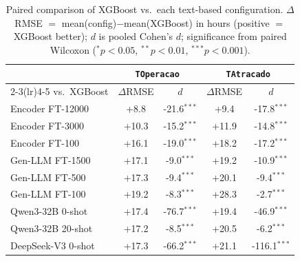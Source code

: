 \documentclass[kdmile,a4paper]{kdmile}
\begin{document}
\begin{table}[t]
\centering
\caption{Paired comparison of XGBoost vs.\ each text-based configuration. $\Delta$RMSE $=$ mean(config)$-$mean(XGBoost) in hours (positive $=$ XGBoost better); $d$ is pooled Cohen's $d$; significance from paired Wilcoxon ($^{*}p{<}0.05$, $^{**}p{<}0.01$, $^{***}p{<}0.001$).}
\label{tab:wilcoxon}
\small
\begin{tabular}{@{}lcccc@{}}
\toprule
& \multicolumn{2}{c}{\texttt{TOperacao}} & \multicolumn{2}{c}{\texttt{TAtracado}} \\
\cmidrule(lr){2-3}\cmidrule(lr){4-5}
vs.\ XGBoost & $\Delta$RMSE & $d$ & $\Delta$RMSE & $d$ \\
\midrule
Encoder FT-12000    & +8.8 & -21.6$^{***}$ & +9.4 & -17.8$^{***}$ \\
Encoder FT-3000     & +10.3 & -15.2$^{***}$ & +11.9 & -14.8$^{***}$ \\
Encoder FT-100      & +16.1 & -19.0$^{***}$ & +18.2 & -17.2$^{***}$ \\
Gen-LLM FT-1500     & +17.1 & -9.0$^{***}$  & +19.2 & -10.9$^{***}$ \\
Gen-LLM FT-500      & +17.3 & -9.4$^{***}$  & +20.1 & -9.4$^{***}$ \\
Gen-LLM FT-100      & +19.2 & -8.3$^{***}$  & +28.3 & -2.7$^{***}$ \\
Qwen3-32B 0-shot    & +17.4 & -76.7$^{***}$ & +19.4 & -46.9$^{***}$ \\
Qwen3-32B 20-shot   & +17.2 & -8.5$^{***}$  & +20.5 & -6.2$^{***}$ \\
DeepSeek-V3 0-shot  & +17.3 & -66.2$^{***}$ & +21.1 & -116.1$^{***}$ \\
\bottomrule
\end{tabular}
\end{table}
\end{document}
